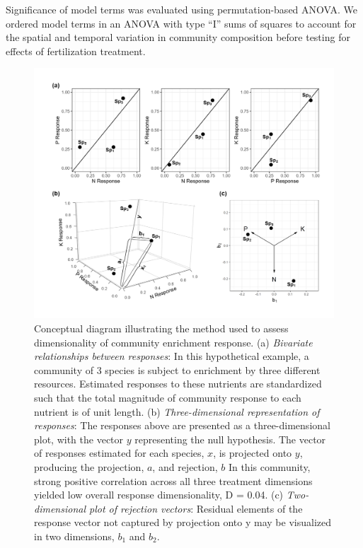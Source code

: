 \documentclass[twoside,12pt,final]{ucthesis-CA2012}
\begin{document}
\begin{ucmainmatter}
Significance of model terms was evaluated using permutation-based ANOVA. We ordered model terms in an ANOVA with type ``I'' sums of squares to account for the spatial and temporal variation in community composition before testing for effects of fertilization treatment.
\begin{figure}
\centering
\includegraphics[width=\textwidth,height=0.6\textheight]{figure/Fig1_1.png}
\caption{Conceptual diagram illustrating the method used to assess dimensionality of community enrichment response. \newline (a) \emph{Bivariate relationships between responses}: In this hypothetical example, a community of 3 species is subject to enrichment by three different resources. Estimated responses to these nutrients are standardized such that the total magnitude of community response to each nutrient is of unit length. \newline (b) \emph{Three-dimensional representation of responses}: The responses above are presented as a three-dimensional plot, with the vector \(y\) representing the null hypothesis. The vector of responses estimated for each species, \(x\), is projected onto \(y\), producing the projection, \(a\), and rejection, \(b\) In this community, strong positive correlation across all three treatment dimensions yielded low overall response dimensionality, D = 0.04. \newline (c) \emph{Two-dimensional plot of rejection vectors}: Residual elements of the response vector not captured by projection onto y may be visualized in two dimensions, \(b_1\) and \(b_2\). \label{fig-1-1}}
\end{figure}
\newline


\end{ucmainmatter}
\end{document}
